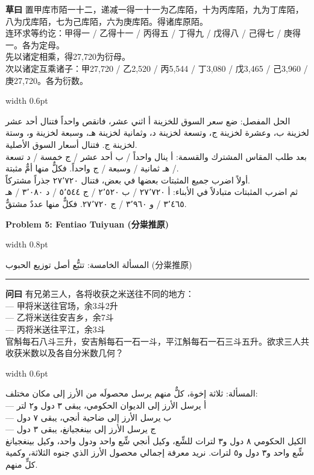 \documentclass[11pt,a4paper]{article}
\newlength{\cnwidth}
\newlength{\arwidth}
\newcommand{\paralleltext}[2]{%
  \par\medskip\noindent
  \begin{minipage}[t]{\cnwidth}%
    \small #1%
  \end{minipage}%
  \hfill\textcolor{colrule}{\vrule width 0.6pt}\hfill
  \begin{minipage}[t]{\arwidth}%
    \small\arabicfont\beginR #2\endR%
  \end{minipage}%
  \par\medskip
}
\newcommand{\parallelsection}[2]{%
  \par\bigskip\noindent
  \begin{minipage}[t]{\cnwidth}%
    \Large\bfseries\color{sectioncolor} #1%
  \end{minipage}%
  \hfill\textcolor{colrule}{\vrule width 0.8pt}\hfill
  \begin{minipage}[t]{\arwidth}%
    \Large\arabicfontbf\color{sectioncolor}\beginR #2\endR%
  \end{minipage}%
  \par\medskip\noindent\textcolor{colrule}{\rule{\textwidth}{0.6pt}}\par\medskip
}
\newcommand{\cnlabel}[1]{\textbf{\color{notecolor}#1}}
\newcommand{\arlabel}[1]{\arabicfontbf\color{notecolor}\beginR #1\endR}
\begin{document}
\paralleltext{%
\cnlabel{草曰} 置甲库市陌一十二，递减一得一十一为乙库陌，十为丙库陌，九为丁库陌，八为戊库陌，七为己库陌，六为庚库陌。得诸库原陌。\\
连环求等约讫：甲得一 / 乙得十一 / 丙得五 / 丁得九 / 戊得八 / 己得七 / 庚得一。各为定母。\\
先以诸定相乘，得27,720为衍母。\\
次以诸定互乘诸子：甲27,720 / 乙2,520 / 丙5,544 / 丁3,080 / 戊3,465 / 己3,960 / 庚27,720。各为衍数。%
}{%
\arlabel{الحل المفصل:} ضع سعر السوق للخزينة أ اثني عشر، فانقص واحداً فتنال أحد عشر لخزينة ب، وعشرة لخزينة ج، وتسعة لخزينة د، وثمانية لخزينة هـ، وسبعة لخزينة و، وستة لخزينة ج. فتنال أسعار السوق الأصلية.\\
بعد طلب المقاس المشترك والقسمة: أ ينال واحداً / ب أحد عشر / ج خمسة / د تسعة / هـ ثمانية / وسبعة / ج واحداً. فكلٌّ منها أمٌّ مثبتة.\\
أولاً اضرب جميع المثبتات بعضها في بعض، فتنال ٢٧٬٧٢٠ جذراً مشتركاً.\\
ثم اضرب المثبتات متبادلاً في الأبناء: أ ٢٧٬٧٢٠ / ب ٢٬٥٢٠ / ج ٥٬٥٤٤ / د ٣٬٠٨٠ / هـ ٣٬٤٦٥ / و ٣٬٩٦٠ / ج ٢٧٬٧٢٠. فكلٌّ منها عددٌ مشتقٌّ.
}

\newpage

\parallelsection{Problem 5: Fentiao Tuiyuan (分粜推原)}{المسألة الخامسة: تتبُّع أصل توزيع الحبوب (分粜推原)}

\paralleltext{%
\cnlabel{问曰} 有兄弟三人，各将收获之米送往不同的地方：\\
--- 甲将米送往官场，余3斗2升\\
--- 乙将米送往安吉乡，余7斗\\
--- 丙将米送往平江，余3斗\\
官斛每石八斗三升，安吉斛每石一石一斗，平江斛每石一石三斗五升。欲求三人共收获米数以及各自分米数几何？%
}{%
\arlabel{المسألة:} ثلاثة إخوة، كلٌّ منهم يرسل محصولَه من الأرز إلى مكان مختلف:\\
--- أ يرسل الأرز إلى الديوان الحكومي، يبقى ٣ دول و٢ لتر\\
--- ب يرسل الأرز إلى ضاحية أنجي، يبقى ٧ دول\\
--- ج يرسل الأرز إلى بينغجيانغ، يبقى ٣ دول\\
الكيل الحكومي ٨ دول و٣ لترات للشِّع، وكيل أنجي شِّع واحد ودول واحد، وكيل بينغجيانغ شِّع واحد و٣ دول و٥ لترات. نريد معرفة إجمالي محصول الأرز الذي جنوه الثلاثة، وكمية كلٍّ منهم.
}
\end{document}
